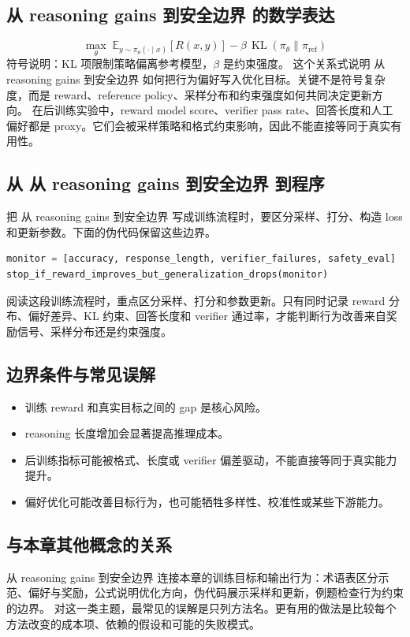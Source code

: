 \documentclass[a4paper]{article}
\begin{document}
\subsection{从 reasoning gains 到安全边界 的数学表达}
\[\max_\theta\; \mathbb{E}_{y\sim\pi_\theta(\cdot\mid x)}[R(x,y)]-\beta\,\operatorname{KL}(\pi_\theta\|\pi_{\text{ref}})\]
符号说明：KL 项限制策略偏离参考模型，\(\beta\) 是约束强度。
这个关系式说明 从 reasoning gains 到安全边界 如何把行为偏好写入优化目标。关键不是符号复杂度，而是 reward、reference policy、采样分布和约束强度如何共同决定更新方向。
在后训练实验中，reward model score、verifier pass rate、回答长度和人工偏好都是 proxy。它们会被采样策略和格式约束影响，因此不能直接等同于真实有用性。
\subsection{从 从 reasoning gains 到安全边界 到程序}
把 从 reasoning gains 到安全边界 写成训练流程时，要区分采样、打分、构造 loss 和更新参数。下面的伪代码保留这些边界。
\begin{lstlisting}[language=Python]
monitor = [accuracy, response_length, verifier_failures, safety_eval]
stop_if_reward_improves_but_generalization_drops(monitor)
\end{lstlisting}
阅读这段训练流程时，重点区分采样、打分和参数更新。只有同时记录 reward 分布、偏好差异、KL 约束、回答长度和 verifier 通过率，才能判断行为改善来自奖励信号、采样分布还是约束强度。
\subsection{边界条件与常见误解}
\begin{itemize}
\item 训练 reward 和真实目标之间的 gap 是核心风险。
\item reasoning 长度增加会显著提高推理成本。
\item 后训练指标可能被格式、长度或 verifier 偏差驱动，不能直接等同于真实能力提升。
\item 偏好优化可能改善目标行为，也可能牺牲多样性、校准性或某些下游能力。
\end{itemize}
\subsection{与本章其他概念的关系}
从 reasoning gains 到安全边界 连接本章的训练目标和输出行为：术语表区分示范、偏好与奖励，公式说明优化方向，伪代码展示采样和更新，例题检查行为约束的边界。
对这一类主题，最常见的误解是只列方法名。更有用的做法是比较每个方法改变的成本项、依赖的假设和可能的失败模式。
\end{document}
